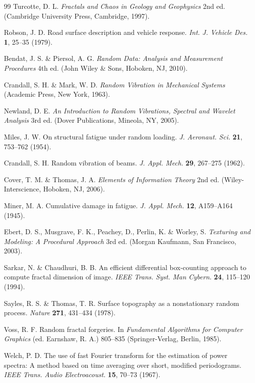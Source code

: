 \documentclass[11pt,letterpaper]{article}
\begin{document}
\begin{thebibliography}{99}
Turcotte, D. L. \textit{Fractals and Chaos in Geology and Geophysics} 2nd ed. (Cambridge University Press, Cambridge, 1997).

Robson, J. D. Road surface description and vehicle response. \textit{Int. J. Vehicle Des.} \textbf{1}, 25--35 (1979).

Bendat, J. S. \& Piersol, A. G. \textit{Random Data: Analysis and Measurement Procedures} 4th ed. (John Wiley \& Sons, Hoboken, NJ, 2010).

Crandall, S. H. \& Mark, W. D. \textit{Random Vibration in Mechanical Systems} (Academic Press, New York, 1963).

Newland, D. E. \textit{An Introduction to Random Vibrations, Spectral and Wavelet Analysis} 3rd ed. (Dover Publications, Mineola, NY, 2005).

Miles, J. W. On structural fatigue under random loading. \textit{J. Aeronaut. Sci.} \textbf{21}, 753--762 (1954).

Crandall, S. H. Random vibration of beams. \textit{J. Appl. Mech.} \textbf{29}, 267--275 (1962).

Cover, T. M. \& Thomas, J. A. \textit{Elements of Information Theory} 2nd ed. (Wiley-Interscience, Hoboken, NJ, 2006).

Miner, M. A. Cumulative damage in fatigue. \textit{J. Appl. Mech.} \textbf{12}, A159--A164 (1945).

Ebert, D. S., Musgrave, F. K., Peachey, D., Perlin, K. \& Worley, S. \textit{Texturing and Modeling: A Procedural Approach} 3rd ed. (Morgan Kaufmann, San Francisco, 2003).

Sarkar, N. \& Chaudhuri, B. B. An efficient differential box-counting approach to compute fractal dimension of image. \textit{IEEE Trans. Syst. Man Cybern.} \textbf{24}, 115--120 (1994).

Sayles, R. S. \& Thomas, T. R. Surface topography as a nonstationary random process. \textit{Nature} \textbf{271}, 431--434 (1978).

Voss, R. F. Random fractal forgeries. In \textit{Fundamental Algorithms for Computer Graphics} (ed. Earnshaw, R. A.) 805--835 (Springer-Verlag, Berlin, 1985).

Welch, P. D. The use of fast Fourier transform for the estimation of power spectra: A method based on time averaging over short, modified periodograms. \textit{IEEE Trans. Audio Electroacoust.} \textbf{15}, 70--73 (1967).

\end{thebibliography}
\end{document}
